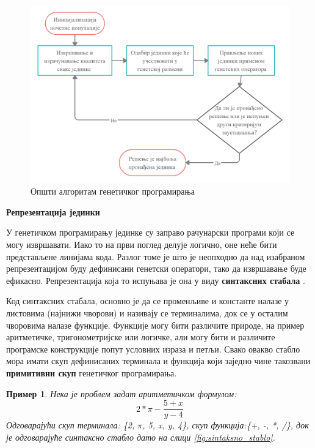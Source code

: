 \documentclass[a4paper]{article}
\newtheorem{primer}{Пример}[section]
\begin{document}
\begin{figure}[ht!]
    \begin{center}
        \includegraphics[scale=0.22]{opsti_algoritam.png}
    \end{center}
    \caption{Општи алгоритам генетичког програмирања}
    \label{fig:kontrola_toka}
\end{figure}

\medskip
\noindent
\textbf{\large Репрезентација јединки}\newline

У генетичком програмирању јединке су заправо рачунарски програми који се могу извршавати. Иако то на први поглед делује логично, оне неће бити представљене линијама кода. Разлог томе је што је неопходно да над изабраном репрезентацијом буду дефинисани генетски оператори, тако да извршавање буде ефикасно. Репрезентација која то испуњава је она у виду \textbf{синтаксних стабала} \cite{synTrees}.\newline

Код синтаксних стабала, основно је да се променљиве и константе налазе у листовима (најнижи чворови) и називају се терминалима, док се у осталим чворовима налазе функције. Функције могу бити различите природе, на пример аритметичке, тригонометријске или логичке, али могу бити и различите програмске конструкције попут условних израза и петљи. Свако овакво стабло мора имати скуп дефинисаних терминала и функција који заједно чине такозвани \textbf{примитивни скуп} генетичког програмирања. 

\begin{primer}
    Нека је проблем задат аритметичком формулом: 
    \begin{equation} 
        \label{eq:sintaksno_stablo}
        2*\pi-\frac{5+x}{y-4}
    \end{equation}
    Одговарајући скуп терминала: \{2, $\pi$, 5, x, y, 4\}, скуп функција:\newline \{+, -, *, /\}, док је одговарајуће синтаксно стабло дато на слици \ref{fig:sintaksno_stablo}.
\end{primer}
\end{document}
